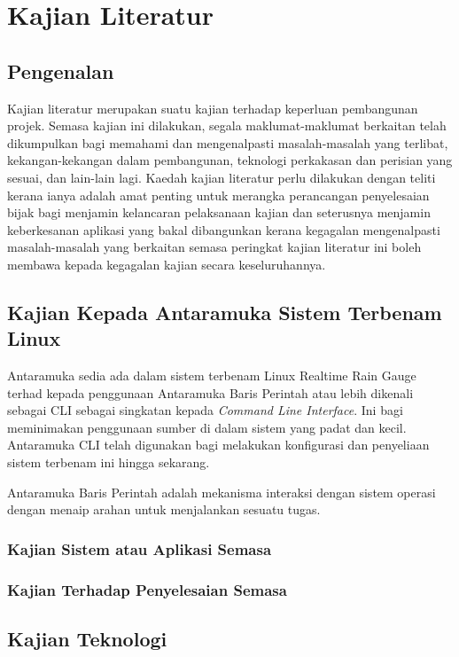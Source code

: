 \chapter{Kajian Literatur}\label{c1}%

\section{Pengenalan}
Kajian literatur merupakan suatu kajian terhadap keperluan pembangunan projek. Semasa kajian ini dilakukan, segala maklumat-maklumat berkaitan telah dikumpulkan bagi memahami dan mengenalpasti masalah-masalah yang terlibat, kekangan-kekangan dalam pembangunan, teknologi perkakasan dan perisian yang sesuai, dan lain-lain lagi. Kaedah kajian literatur perlu dilakukan dengan teliti kerana ianya adalah amat penting untuk merangka
perancangan penyelesaian bijak bagi menjamin kelancaran pelaksanaan kajian dan seterusnya menjamin keberkesanan aplikasi yang bakal dibangunkan kerana kegagalan mengenalpasti masalah-masalah yang berkaitan semasa peringkat kajian literatur ini boleh membawa kepada kegagalan kajian secara keseluruhannya.

\section{Kajian Kepada Antaramuka Sistem Terbenam Linux}
Antaramuka sedia ada dalam sistem terbenam Linux Realtime Rain Gauge terhad kepada penggunaan Antaramuka Baris Perintah atau lebih dikenali sebagai CLI sebagai singkatan kepada \textit{Command Line Interface}. Ini bagi meminimakan penggunaan sumber di dalam sistem yang padat dan kecil. Antaramuka CLI telah digunakan bagi melakukan konfigurasi dan penyeliaan sistem terbenam ini hingga sekarang.

Antaramuka Baris Perintah adalah mekanisma interaksi dengan sistem operasi dengan menaip arahan untuk menjalankan sesuatu tugas.

\subsection{Kajian Sistem atau Aplikasi Semasa}

\subsection{Kajian Terhadap Penyelesaian Semasa}

\section{Kajian Teknologi}

